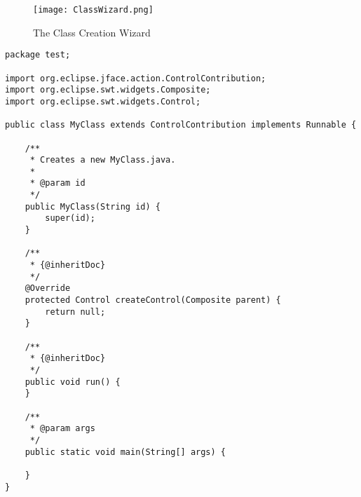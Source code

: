 \begin{figure}[ClassWizard]
  \centering
  \texttt{[image: ClassWizard.png]}
  \caption[The Class Creation Wizard]%
  {The Class Creation Wizard\protect}
  \label{fig:ClassWizard}
\end{figure}

\lstset{
  language=Java,
}
\begin{lstlisting}[caption={Code generated by the wizard},label={fig:classCreationGenerated}]
package test;

import org.eclipse.jface.action.ControlContribution;
import org.eclipse.swt.widgets.Composite;
import org.eclipse.swt.widgets.Control;

public class MyClass extends ControlContribution implements Runnable {

    /**
     * Creates a new MyClass.java.
     * 
     * @param id
     */
    public MyClass(String id) {
        super(id);
    }

    /**
     * {@inheritDoc}
     */
    @Override
    protected Control createControl(Composite parent) {
        return null;
    }

    /**
     * {@inheritDoc}
     */
    public void run() {
    }

    /**
     * @param args
     */
    public static void main(String[] args) {

    }
}
\end{lstlisting}



